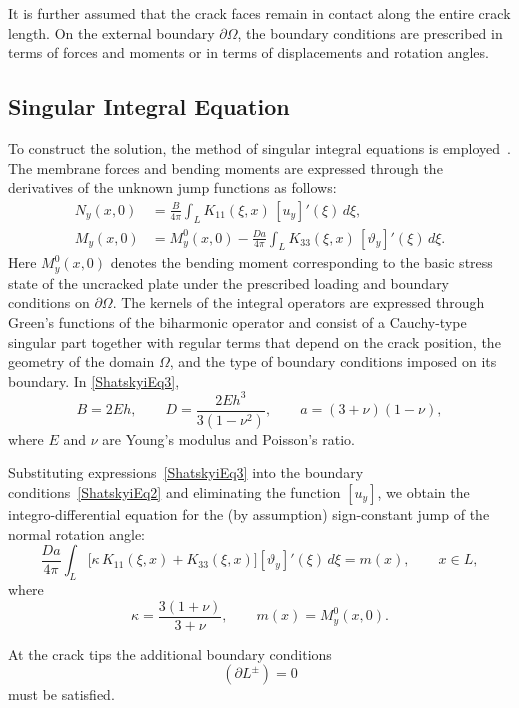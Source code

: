 It is further assumed that the crack faces remain in contact along the entire crack length. On the external boundary $\partial\Omega$, the boundary conditions are prescribed in terms of forces and moments or in terms of displacements and rotation angles.

\subsection{Singular Integral Equation}

To construct the solution, the method of singular integral equations is employed~\cite{Shatskyi21}. The membrane forces and bending moments are expressed through the derivatives of the unknown jump functions as follows:
\begin{equation}
	\begin{aligned}
		N_y(x,0) &= \frac{B}{4\pi}\int_L K_{11}(\xi,x)\,[u_y]'(\xi)\,d\xi,\\
		M_y(x,0) &= M_y^0(x,0) - \frac{Da}{4\pi}\int_L K_{33}(\xi,x)\,[\vartheta_y]'(\xi)\,d\xi .
	\end{aligned}
	\label{ShatskyiEq3}
\end{equation}
%
Here $M_y^0(x,0)$ denotes the bending moment corresponding to the basic stress state of the uncracked plate under the prescribed loading and boundary conditions on $\partial\Omega$. The kernels of the integral operators are expressed through Green's functions of the biharmonic operator and consist of a Cauchy-type singular part together with regular terms that depend on the crack position, the geometry of the domain $\Omega$, and the type of boundary conditions imposed on its boundary.
%
In \eqref{ShatskyiEq3},
\[
B={2Eh},
\qquad
D=\frac{2Eh^3}{3(1-\nu^2)},\qquad a=(3+\nu)(1-\nu),
\]
%
where $E$ and $\nu$ are Young's modulus and Poisson's ratio.

Substituting expressions~\eqref{ShatskyiEq3} into the boundary conditions~\eqref{ShatskyiEq2} and eliminating the function $[u_y]$, we obtain the integro-differential equation for the (by assumption) sign-constant jump of the normal rotation angle:
\begin{equation}
	\frac{Da}{4\pi}\int_L
	\bigl[\kappa\,K_{11}(\xi,x)+K_{33}(\xi,x)\bigr]
	[\vartheta_y]'(\xi)\,d\xi
	=
	m(x),
	\qquad x\in L,
	\label{ShatskyiEq4}
\end{equation}
where
\[
\kappa=\frac{3(1+\nu)}{3+\nu},
\qquad
m(x)=M_y^0(x,0).
\]

At the crack tips the additional boundary conditions
\begin{equation}
	[\vartheta_y](\partial L^{\pm})=0
	\label{ShatskyiEq5}
\end{equation}
must be satisfied.

